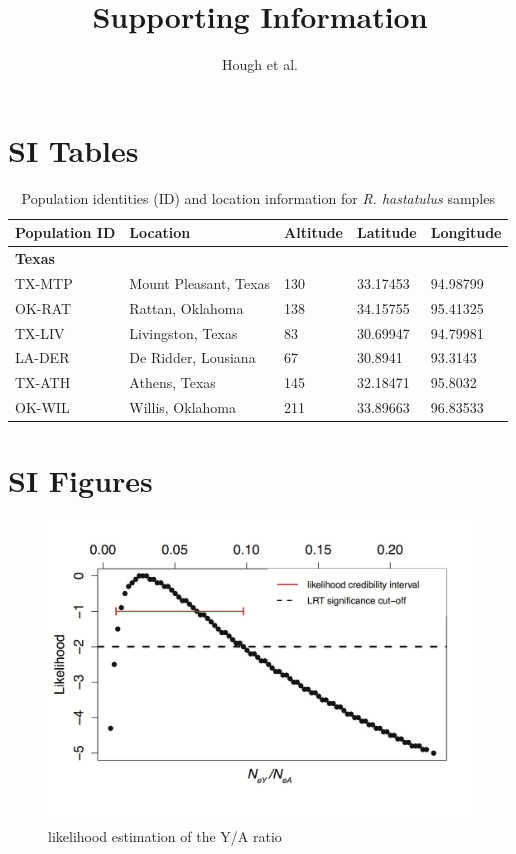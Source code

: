 \documentclass[9pt,onecolumn,twoside]{pnas-new}
\title{Supporting Information}
\author{Hough et al.}
\begin{document}
\maketitle


\section*{SI Tables}

\begin{table}[tbhp!]
\centering
\caption{Population identities (ID) and location information for \textit{R. hastatulus} samples}
\begin{tabular}{lllll}
Population ID & Location & Altitude & Latitude & Longitude \\
\midrule
\textbf{Texas} &  &  &  &  \\
TX-MTP & Mount Pleasant, Texas & 130	 & 33.17453 & 94.98799 \\
OK-RAT & Rattan, Oklahoma & 138 & 34.15755 & 95.41325 \\
TX-LIV & Livingston, Texas & 83 & 30.69947 & 94.79981 \\
LA-DER & De Ridder, Lousiana & 67 & 30.8941 & 93.3143 \\
TX-ATH & Athens, Texas & 145 & 32.18471 & 95.8032 \\
OK-WIL & Willis, Oklahoma & 211 & 33.89663 & 96.83533 \\
\bottomrule
\end{tabular}
\end{table}

\section*{SI Figures}

\begin{figure}[tbhp!]
\centering
\includegraphics[width=.5\linewidth]{FigureS1.png}
\caption{likelihood estimation of the Y/A ratio}
\label{figure:FigureS1}
\end{figure}
\end{document}
